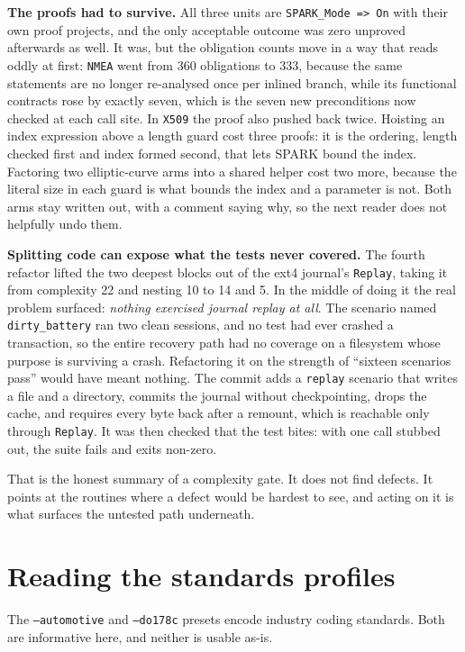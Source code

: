 \textbf{The proofs had to survive.} All three units are \lstinline{SPARK_Mode => On}
with their own proof projects, and the only acceptable outcome was zero unproved
afterwards as well. It was, but the obligation counts move in a way that reads
oddly at first: \lstinline{NMEA} went from 360 obligations to 333, because the
same statements are no longer re-analysed once per inlined branch, while its
functional contracts rose by exactly seven, which is the seven new preconditions
now checked at each call site. In \lstinline{X509} the proof also pushed back
twice. Hoisting an index expression above a length guard cost three proofs: it is
the ordering, length checked first and index formed second, that lets SPARK bound
the index. Factoring two elliptic-curve arms into a shared helper cost two more,
because the literal size in each guard is what bounds the index and a parameter is
not. Both arms stay written out, with a comment saying why, so the next reader does
not helpfully undo them.

\textbf{Splitting code can expose what the tests never covered.} The fourth
refactor lifted the two deepest blocks out of the ext4 journal's
\lstinline{Replay}, taking it from complexity 22 and nesting 10 to 14 and 5. In
the middle of doing it the real problem surfaced: \emph{nothing exercised journal
replay at all}. The scenario named \texttt{dirty\_battery} ran two clean sessions,
and no test had ever crashed a transaction, so the entire recovery path had no
coverage on a filesystem whose purpose is surviving a crash. Refactoring it on the
strength of ``sixteen scenarios pass'' would have meant nothing. The commit adds a
\texttt{replay} scenario that writes a file and a directory, commits the journal
without checkpointing, drops the cache, and requires every byte back after a
remount, which is reachable only through \lstinline{Replay}. It was then checked
that the test bites: with one call stubbed out, the suite fails and exits non-zero.

That is the honest summary of a complexity gate. It does not find defects. It
points at the routines where a defect would be hardest to see, and acting on it is
what surfaces the untested path underneath.

\section{Reading the standards profiles}

The \texttt{--automotive} and \texttt{--do178c} presets encode industry coding
standards. Both are informative here, and neither is usable as-is.

